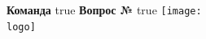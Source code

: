 \def \ifbarc {true}
\def \iflogo {true}


    \noindent
    \hspace{-2mm}\textbf{Команда {\LARGE\theteams}}
    \ifx\ifbarc\useBarcode
      {\hfill {}  \hfill}
    \else \hfill
    \fi
    \textbf{Вопрос №{\LARGE\thequestions}}
    \vfill
    \ifx\iflogo\useLogo
      {\hspace{-3mm}\texttt{[image: \\logo]}}
    \else \ 
    \fi
    \newline \newline \newline
    

